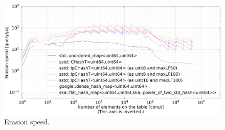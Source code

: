 \begin{figure}[h]
  \hspace{-3mm}
  \includegraphics[scale=0.24]{./fig_bench/erase_med.pdf}
  \caption{ Erasion speed. }
  \label{fig_bench_insert}
\end{figure}
















